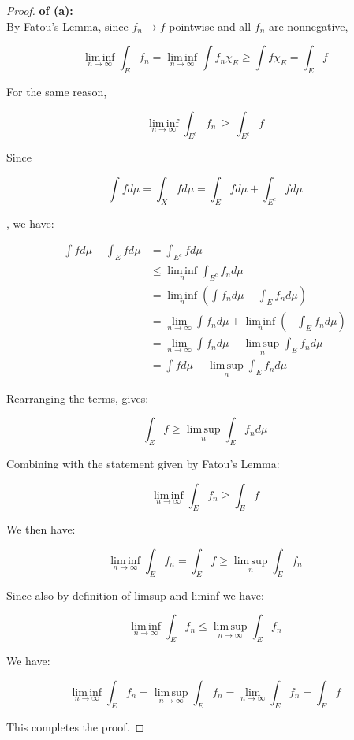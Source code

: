 \begin{proof}

\textbf{of (a):}\\
By Fatou's Lemma, since \(f_{n}\rightarrow f\) pointwise and all \(f_{n}\) are nonnegative,

\[\operatorname{lim\, inf}\limits_{n\rightarrow\infty}\int_{E}f_{n} = \operatorname{lim\, inf}\limits_{n\rightarrow\infty}\int f_{n}\chi_{E} \geq \int f\chi_{E} = \int_{E}f\]

For the same reason,

\[\operatorname{lim\, inf}\limits_{n\rightarrow\infty}\int_{E^{c}}f_{n}\, \geq \,\int_{E^{c}}f\]

Since

\[\int f d\mu = \int_{X}f d\mu = \int_{E}f d\mu + \int_{E^{c}}f d\mu\]

, we have:

\[\begin{matrix}
{\int f d\mu - \int_{E}f d\mu} & {= \int_{E^{c}}f d\mu} \\
 & {\leq \operatorname{lim\, inf}\limits_{n}\int_{E^{c}}f_{n} d\mu} \\
 & {= \operatorname{lim\, inf}\limits_{n}(\int f_{n} d\mu - \int_{E}f_{n} d\mu)} \\
 & {= \lim\limits_{n\rightarrow\infty}\int f_{n} d\mu + \operatorname{lim\, inf}\limits_{n}( - \int_{E}f_{n} d\mu)} \\
 & {= \lim\limits_{n\rightarrow\infty}\int f_{n} d\mu - \operatorname{lim\, sup}\limits_{n}\int_{E}f_{n} d\mu} \\
 & {= \int f d\mu - \operatorname{lim\, sup}\limits_{n}\int_{E}f_{n} d\mu}
\end{matrix}\]

Rearranging the terms, gives:

\[\int_{E}f \geq \operatorname{lim\, sup}\limits_{n}\int_{E}f_{n} d\mu\]

Combining with the statement given by Fatou's Lemma:

\[\operatorname{lim\, inf}\limits_{n\rightarrow\infty}\int_{E}f_{n} \geq \int_{E}f\]

We then have:

\[\operatorname{lim\, inf}\limits_{n\rightarrow\infty}\int_{E}f_{n} = \int_{E}f \geq \operatorname{lim\, sup}\limits_{n}\int_{E}f_{n}\]

Since also by definition of limsup and liminf we have:

\[\operatorname{lim\, inf}\limits_{n\rightarrow\infty}\int_{E}f_{n} \leq \operatorname{lim\, sup}\limits_{n\rightarrow\infty}\int_{E}f_{n}\]

We have:

\[\operatorname{lim\, inf}\limits_{n\rightarrow\infty}\int_{E}f_{n} = \operatorname{lim\, sup}\limits_{n\rightarrow\infty}\int_{E}f_{n} = \lim\limits_{n\rightarrow\infty}\int_{E}f_{n} = \int_{E}f\]

This completes the proof.

\end{proof}


